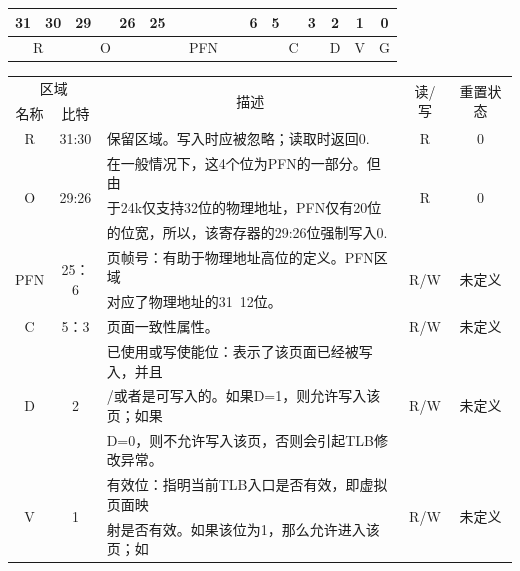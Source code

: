 \begin{enumerate}[(1)]
\begin{table}[H]
\centering
\begin{tabular}{cccccccccccccccccc}
31&30&29&&26&25&&&&&&6&5&&3&2&1&0\\
\hline
\multicolumn{2}{|c|}{R}&
\multicolumn{3}{c|}{O}&
\multicolumn{7}{c|}{PFN}&
\multicolumn{3}{c|}{C}&
\multicolumn{1}{c|}{D}&
\multicolumn{1}{c|}{V}&
\multicolumn{1}{c|}{G}\\
\hline
\end{tabular}
\end{table}

\begin{table}[H]
\centering
\begin{tabular}{|c|c|c|c|c|}
\hline
\multicolumn{2}{|c|}{区域}&
\multirow{2}{*}{描述}&
\multirow{2}{*}{读/写}&
\multirow{2}{*}{重置状态}\\
\cline{1-2}
名称&比特&&&\\
\hline
R&31:30&
\multicolumn{1}{l|}{保留区域。写入时应被忽略；读取时返回0.}&
R&0\\
\hline
\multirow{3}{*}{O}&
\multirow{3}{*}{29:26}&
\multicolumn{1}{l|}{在一般情况下，这4个位为PFN的一部分。但由}&
\multirow{3}{*}{R}&
\multirow{3}{*}{0}\\
&&
\multicolumn{1}{l|}{于24k仅支持32位的物理地址，PFN仅有20位}&
&\\
&&
\multicolumn{1}{l|}{的位宽，所以，该寄存器的29:26位强制写入0.}&
&\\
\hline
\multirow{2}{*}{PFN}&
\multirow{2}{*}{25：6}&
\multicolumn{1}{l|}{页帧号：有助于物理地址高位的定义。PFN区域}&
\multirow{2}{*}{R/W}&
\multirow{2}{*}{未定义}\\
&&
\multicolumn{1}{l|}{对应了物理地址的31~12位。}&
&\\
\hline
C&5：3&
\multicolumn{1}{l|}{页面一致性属性。}&
R/W&未定义\\
\hline
\multirow{3}{*}{D}&
\multirow{3}{*}{2}&
\multicolumn{1}{l|}{已使用或写使能位：表示了该页面已经被写入，并且}&
\multirow{3}{*}{R/W}&
\multirow{3}{*}{未定义}\\
&&
\multicolumn{1}{l|}{/或者是可写入的。如果D=1，则允许写入该页；如果}&
&\\
&&
\multicolumn{1}{l|}{D=0，则不允许写入该页，否则会引起TLB修改异常。}&
&\\
\hline
\multirow{4}{*}{V}&
\multirow{4}{*}{1}&
\multicolumn{1}{l|}{有效位：指明当前TLB入口是否有效，即虚拟页面映}&
\multirow{4}{*}{R/W}&
\multirow{4}{*}{未定义}\\
&&
\multicolumn{1}{l|}{射是否有效。如果该位为1，那么允许进入该页；如}&

\end{tabular}
\end{table}
\end{enumerate}
